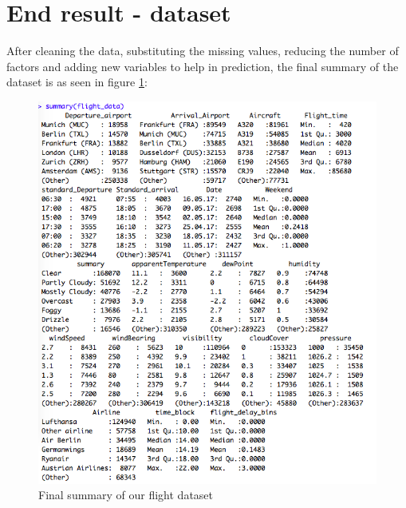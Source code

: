 \section{End result - dataset}

After cleaning the data, substituting the missing values, reducing the number of factors and adding new variables to help in prediction, the final summary of the dataset is as seen in figure \ref{fig:summary_flights}:

\begin{figure}[ht]
    \centering
    \includegraphics[width=\textwidth]{Figures/summary_flight_data.png}
    \caption{Final summary of our flight dataset}
    \label{fig:summary_flights}
\end{figure}